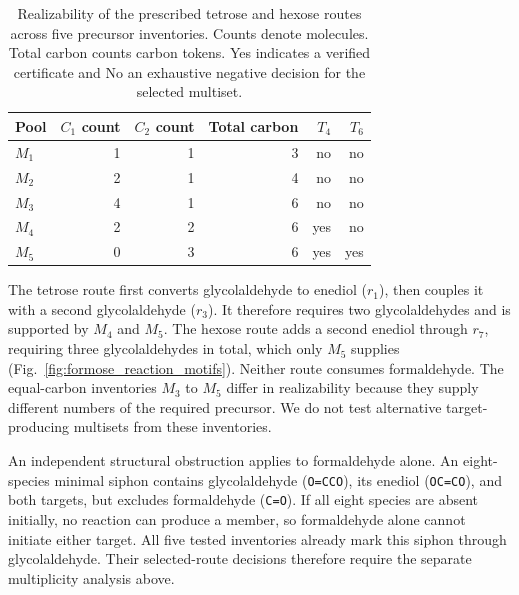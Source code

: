\documentclass[10pt,a4paper,fleqn]{article}
\theoremstyle{plain}\newtheorem{theorem}{Theorem}
\begin{document}
\begin{table}[htbp]
\centering
\caption{Realizability of the prescribed tetrose and hexose routes across five precursor inventories. Counts denote molecules. Total carbon counts carbon tokens. Yes indicates a verified certificate and No an exhaustive negative decision for the selected multiset.}
\label{tab:formose_exact_benchmark}
\begin{tabular*}{\linewidth}{@{\extracolsep{\fill}}lrrrrr@{}}
\toprule
Pool & $C_1$ count & $C_2$ count & Total carbon & $T_4$ & $T_6$ \\
\midrule
$M_1$ & 1 & 1 & 3 & no & no \\
$M_2$ & 2 & 1 & 4 & no & no \\
$M_3$ & 4 & 1 & 6 & no & no \\
$M_4$ & 2 & 2 & 6 & yes & no \\
$M_5$ & 0 & 3 & 6 & yes & yes \\
\bottomrule
\end{tabular*}
\end{table}

The tetrose route first converts glycolaldehyde to enediol ($r_1$), then couples it with a second glycolaldehyde ($r_3$). It therefore requires two glycolaldehydes and is supported by $M_4$ and $M_5$. The hexose route adds a second enediol through $r_7$, requiring three glycolaldehydes in total, which only $M_5$ supplies (Fig.~\ref{fig:formose_reaction_motifs}). Neither route consumes formaldehyde. The equal-carbon inventories $M_3$ to $M_5$ differ in realizability because they supply different numbers of the required precursor. We do not test alternative target-producing multisets from these inventories.

An independent structural obstruction applies to formaldehyde alone. An eight-species minimal siphon contains glycolaldehyde (\texttt{O=CCO}), its enediol (\texttt{OC=CO}), and both targets, but excludes formaldehyde (\texttt{C=O}). If all eight species are absent initially, no reaction can produce a member, so formaldehyde alone cannot initiate either target. All five tested inventories already mark this siphon through glycolaldehyde. Their selected-route decisions therefore require the separate multiplicity analysis above.


\end{document}
